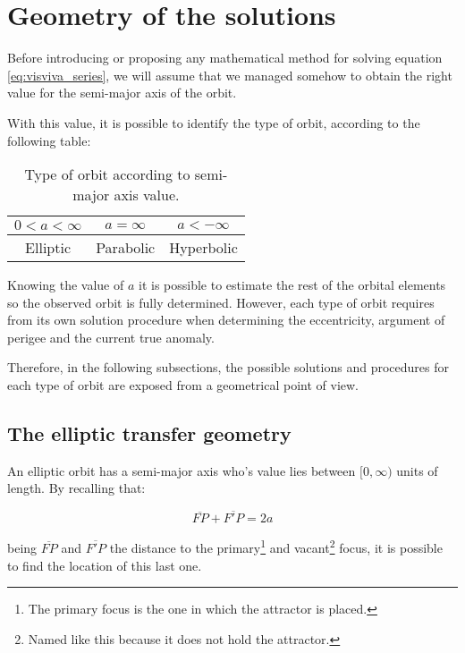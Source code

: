 \section{Geometry of the solutions}

Before introducing or proposing any mathematical method for solving equation
\ref{eq:visviva_series}, we will assume that we managed somehow to obtain the
right value for the semi-major axis of the orbit.

With this value, it is possible to identify the type of orbit, according to the
following table:

\begin{table}[H]
  \centering
  \begin{tabular}{|c|c|c|}
    \hline
    \textbf{$0 < a < \infty$} & \textbf{$a = \infty$} & \textbf{$a < -\infty$} \\ \hline
    Elliptic                  & Parabolic             & Hyperbolic             \\ \hline
  \end{tabular}
  \caption{Type of orbit according to semi-major axis value.}
\end{table}

Knowing the value of $a$ it is possible to estimate the rest of the orbital
elements so the observed orbit is fully determined. However, each type of orbit
requires from its own solution procedure when determining the eccentricity,
argument of perigee and the current true anomaly.

Therefore, in the following subsections, the possible solutions and procedures
for each type of orbit are exposed from a geometrical point of view.

\subsection{The elliptic transfer geometry}

An elliptic orbit has a semi-major axis who's value lies between $[0,\infty)$
units of length. By recalling that:

\begin{equation}
  \overline{FP} + \overline{F'P} = 2a
  \label{eq:ellipse_property}
\end{equation}

being $\overline{FP}$ and $\overline{F'P}$ the distance to the
primary\footnote{The primary focus is the one in which the attractor is placed.}
and vacant\footnote{Named like this because it does not hold the attractor.}
focus, it is possible to find the location of this last one.

